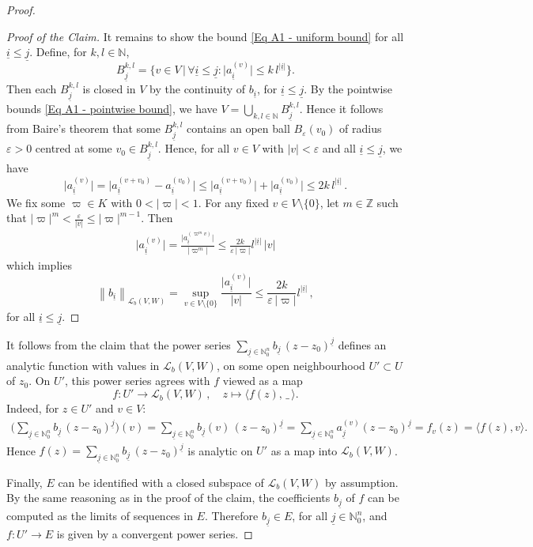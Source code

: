 \documentclass[a4paper, reqno, 10pt]{amsart}
\theoremstyle{definition}
\numberwithin{equation}{section}
\newcommand{\abs}[1]{{\lvert{#1}\rvert}}
\newcommand{\blank}{{\,\_\,}}
\newcommand{\lra}{\longrightarrow}
\newcommand{\lto}{\longmapsto}
\newcommand{\ra}{\rightarrow}
\newcommand{\ul}[1]{{\underline{#1}}}
\newcommand{\BN}{{\mathbb {N}}}
\newcommand{\BZ}{{\mathbb {Z}}}
\newcommand{\CL}{{\mathcal {L}}}
\begin{document}
\begin{proof}
\begin{proof}[Proof of the Claim]
	It remains to show the bound \eqref{Eq A1 - uniform bound} for all $\ul{i}\leq \ul{j}$.
	Define, for $k,l \in \BN$,
	\[B^{k,l}_\ul{j} = \big\{ v\in V \,\big\vert\, \forall \ul{i} \leq \ul{j} \colon \abs{a_\ul{i}^{(v)}} \leq k\, l^{\abs{\ul{i}}} \big\} .\]
	Then each $B_\ul{j}^{k,l}$ is closed in $V$ by the continuity of $b_\ul{i}$, for $\ul{i}\leq \ul{j}$.
	By the pointwise bounds \eqref{Eq A1 - pointwise bound}, we have $ V  =\bigcup_{k,l \in \BN} B_\ul{j}^{k,l}$.
	Hence it follows from Baire's theorem \cite[Ch.\ IX.\ \S 5.3 Thm.\ 1]{Bourbaki66GenTop2} that some $B_\ul{j}^{k,l}$ contains an open ball $B_\varepsilon (v_0)$ of radius $\varepsilon >0$ centred at some $v_0 \in B_\ul{j}^{k,l}$.
	Hence, for all $v \in V$ with $\abs{v}< \varepsilon$ and all $\ul{i}\leq \ul{j}$, we have
	\[\abs{a_\ul{i}^{(v)}} = \abs{a_\ul{i}^{(v+v_0)} - a_\ul{i}^{(v_0)}} \leq \abs{a_\ul{i}^{(v+v_0)}} + \abs{a_\ul{i}^{(v_0)}} \leq 2 k \, l^{\abs{\ul{i}}} \, . \]
	We fix some $\varpi \in K$ with $0 < \abs{\varpi} < 1$.
	For any fixed $v \in V \setminus \{0\}$, let $m \in \BZ$ such that $ \abs{\varpi}^m < \frac{\varepsilon}{\abs{v}} \leq \abs{\varpi}^{m-1}$.
	Then
	\begin{align*}
		\abs{a_\ul{i}^{(v)}} = \frac{\abs{a_\ul{i}^{(\varpi^m v)}}}{\abs{\varpi^m}} \leq \frac{2 k}{\varepsilon \,\abs{\varpi}} l^{\abs{\ul{i}}} \, \abs{v}
	\end{align*}
	which implies
	\[\left\| b_\ul{i} \right\|_{\CL_b(V,W)}= \sup_{v \in V \setminus \{0\}} \frac{\abs{a_\ul{i}^{(v)}}}{\abs{v}} \leq \frac{2 k}{\varepsilon \, \abs{\varpi}} l^{\abs{\ul{i}}} \,,\]
	for all $\ul{i}\leq \ul{j}$.
\end{proof}

It follows from the claim that the power series $\sum_{\ul{j} \in \BN^n_0} b_\ul{j} \, (z-z_0)^\ul{j}$ defines an analytic function with values in $\CL_b(V,W)$, on some open neighbourhood $U' \subset U$ of $z_0$.
On $U'$, this power series agrees with $f$ viewed as a map
\[f \colon U' \lra \CL_b(V,W) \, , \quad  z \lto \langle f(z), \blank \rangle  .\]
Indeed, for $z\in U'$ and $v \in V$:
\begin{align*}
	\bigg( \sum_{\ul{j} \in \BN^n_0} b_\ul{j}\,  (z-z_0)^\ul{j} \bigg)(v) = \sum_{\ul{j} \in \BN^n_0} b_\ul{j}(v) \, (z-z_0)^{\ul{j}} = \sum_{\ul{j} \in \BN^n_0} a_\ul{j}^{(v)} (z-z_0)^\ul{j} = f_v(z) = \langle f(z), v \rangle  .
\end{align*}
Hence $f(z) = \sum_{\ul{j} \in \BN^n_0} b_\ul{j} \, (z-z_0)^\ul{j}$ is analytic on $U'$ as a map into $\CL_b(V,W)$.


Finally, $E$ can be identified with a closed subspace of $\CL_b(V,W)$ by assumption.
By the same reasoning as in the proof of the claim, the coefficients $b_\ul{j}$ of $f$ can be computed as the limits of sequences in $E$.
Therefore $b_\ul{j} \in E$, for all $\ul{j}\in \BN^n_0$, and $f \colon U' \ra E$ is given by a convergent power series.
\end{proof}
\end{document}
